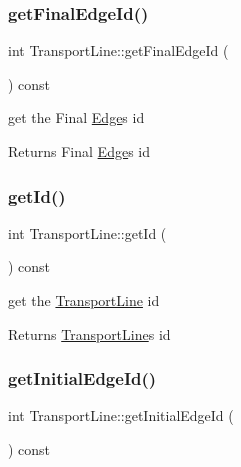 \subsubsection{\texorpdfstring{get\+Final\+Edge\+Id()}{getFinalEdgeId()}}
{\footnotesize\ttfamily int Transport\+Line\+::get\+Final\+Edge\+Id (\begin{DoxyParamCaption}{ }\end{DoxyParamCaption}) const}



get the Final \hyperlink{class_edge}{Edge}\textquotesingle{}s id 

\begin{DoxyReturn}{Returns}
Final \hyperlink{class_edge}{Edge}\textquotesingle{}s id 
\end{DoxyReturn}
\mbox{\label{class_transport_line_a54d4e0502f1ee731f474659ca0352dd5}} 
\subsubsection{\texorpdfstring{get\+Id()}{getId()}}
{\footnotesize\ttfamily int Transport\+Line\+::get\+Id (\begin{DoxyParamCaption}{ }\end{DoxyParamCaption}) const}



get the \hyperlink{class_transport_line}{Transport\+Line} id 

\begin{DoxyReturn}{Returns}
\hyperlink{class_transport_line}{Transport\+Line}\textquotesingle{}s id 
\end{DoxyReturn}
\mbox{\label{class_transport_line_a41824facb9ab92f3818b1b6d7ad89df5}} 
\subsubsection{\texorpdfstring{get\+Initial\+Edge\+Id()}{getInitialEdgeId()}}
{\footnotesize\ttfamily int Transport\+Line\+::get\+Initial\+Edge\+Id (\begin{DoxyParamCaption}{ }\end{DoxyParamCaption}) const}



